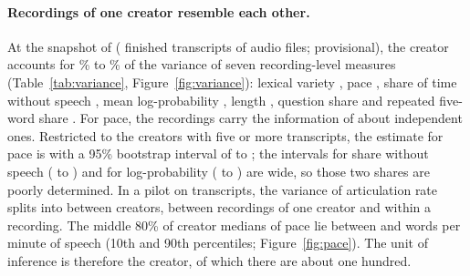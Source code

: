 %

\paragraph{Recordings of one creator resemble each other.}
At the snapshot of \SnapDate{} (\SnapLines{} finished transcripts of \NRunAudio{} audio files; provisional), the creator accounts for \IccMinPct\% to \IccMaxPct\% of the variance of seven recording-level measures (Table~\ref{tab:variance}, Figure~\ref{fig:variance}): lexical variety \IccMattr, pace \IccPace, share of time without speech \IccNonSp, mean log-probability \IccLogp, length \IccLen, question share \IccQuest{} and repeated five-word share \IccRep. For pace, the \IccPaceRecordings{} recordings carry the information of about \NeffPace{} independent ones. Restricted to the \SnapCreatorsFivePlus{} creators with five or more transcripts, the estimate for pace is \IccPaceSeen{} with a 95\% bootstrap interval of \IccPaceSeenLo{} to \IccPaceSeenHi; the intervals for share without speech (\IccNonSpSeenLo{} to \IccNonSpSeenHi) and for log-probability (\IccLogpSeenLo{} to \IccLogpSeenHi) are wide, so those two shares are poorly determined. In a pilot on \VpLedger{} transcripts, the variance of articulation rate splits into \VpArtCreator{} between creators, \VpArtRecording{} between recordings of one creator and \VpArtWithin{} within a recording. The middle 80\% of creator medians of pace lie between \CrPacePten{} and \CrPacePninety{} words per minute of speech (10th and 90th percentiles; Figure~\ref{fig:pace}). The unit of inference is therefore the creator, of which there are about one hundred.

